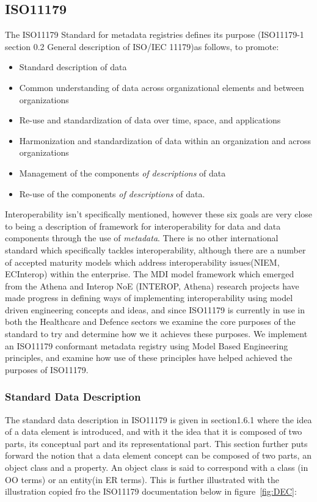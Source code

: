 \documentclass{llncs}
\begin{document}
\subsection{ISO11179}

The ISO11179 Standard for metadata registries defines its purpose (ISO11179-1 section 0.2 General description of ISO/IEC 11179)as follows,
\newline
to promote:
\begin{itemize}
\item Standard description of data
\item Common understanding of data across organizational elements and between organizations
\item Re-use and standardization of data over time, space, and applications
\item Harmonization and standardization of data within an organization and across organizations
\item Management of the components \emph{of descriptions} of data
\item Re-use of the components \emph{of descriptions} of data.
\end{itemize}

Interoperability isn't specifically mentioned, however these six goals are very close to being a description of framework for interoperability for data and data components through the use of \emph{metadata}. There is no other international standard which specifically tackles interoperability, although there are a number of accepted maturity models which address interoperability issues(NIEM, ECInterop) within the enterprise.  The MDI model framework which emerged from the Athena and Interop NoE (INTEROP, Athena) research projects have made progress in defining ways of implementing interoperability using model driven engineering concepts and ideas, and since ISO11179 is currently in use in both the Healthcare and Defence sectors we examine the core purposes of the standard to try and determine how we it achieves these purposes. We implement an ISO11179 conformant metadata registry using Model Based Engineering principles, and examine how use of these principles have helped achieved the purposes of ISO11179. 


\subsubsection{Standard Data Description}

The standard data description in ISO11179 is given in section1.6.1 where the idea of a data element is introduced, and with it the idea that it is composed of two parts, its conceptual part and its representational part. This section further puts forward the notion that a data element concept can be composed of two parts, an object class and a property. An object class is said to correspond with a class (in OO terms) or an entity(in ER terms). This is further illustrated with the illustration copied fro the ISO11179 documentation below in figure~\ref{fig:DEC}:
\end{document}
